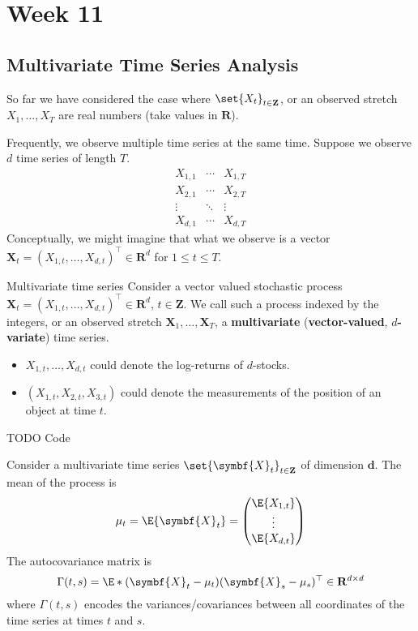 \chapter{Week 11}
\section{Multivariate Time Series Analysis}
So far we have considered the case where
$ \set{X_t}_{t\in\mathbf{Z}} $,
or an observed stretch $ X_1,\ldots,X_T $
are real numbers (take values in $ \mathbf{R} $).

Frequently, we observe multiple time series at the same time.
Suppose we observe $ d $ time series of length $ T $.
\[ \begin{matrix}
        X_{1,1} & \cdots & X_{1,T} \\
        X_{2,1} & \cdots & X_{2,T} \\
        \vdots  & \ddots & \vdots  \\
        X_{d,1} & \cdots & X_{d,T}
    \end{matrix} \]
Conceptually, we might imagine that what we observe
is a vector $ \symbf{X}_t=(X_{1,t},\ldots,X_{d,t})^\top\in\mathbf{R}^d $
for $ 1\le t\le T $.
\begin{Definition}{Multivariate time series}{}
    Consider a vector valued stochastic process
    $ \symbf{X}_t=(X_{1,t},\ldots,X_{d,t})^\top\in\mathbf{R}^d $,
    $ t\in\mathbf{Z} $. We call such a process indexed
    by the integers, or an observed stretch
    $ \symbf{X}_1,\ldots,\symbf{X}_{T} $,
    a \textbf{multivariate} (\textbf{vector-valued}, \textbf{$d$-variate}) time series.
\end{Definition}
\begin{Example}{}{}
    \begin{itemize}
        \item $ X_{1,t},\ldots,X_{d,t} $ could denote the log-returns of $ d $-stocks.
        \item $ (X_{1,t},X_{2,t},X_{3,t}) $ could denote the measurements of the position
              of an object at time $ t $.
    \end{itemize}
\end{Example}
TODO Code
\begin{Definition}{}{}
    Consider a multivariate time series $ \set{\symbf{X}_t}_{t\in\mathbf{Z}} $
    of dimension $ \symbf{d} $. The mean of the process is
    \[ \mu_t=\E{\symbf{X}_t}=\begin{pmatrix}
            \E{X_{1,t}} \\
            \vdots      \\
            \E{X_{d,t}}
        \end{pmatrix} \]
    The autocovariance matrix is
    \[ \Gamma(t,s)=\E*{(\symbf{X}_t-\mu_t)(\symbf{X}_s-\mu_s)^\top}\in\mathbf{R}^{d\times d} \]
    where $ \Gamma(t,s) $ encodes the variances/covariances between all coordinates
    of the time series at times $ t $ and $ s $.
\end{Definition}

